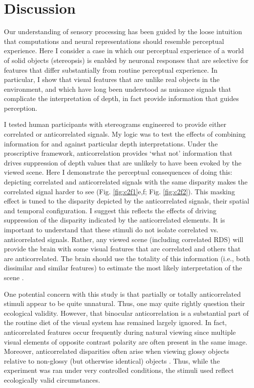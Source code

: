 \section{Discussion}
Our understanding of sensory processing has been guided by the loose intuition that computations and neural representations should resemble perceptual experience. Here I consider a case in which our perceptual experience of a world of solid objects (stereopsis) is enabled by neuronal responses that are selective for features that differ substantially from routine perceptual experience. In particular, I show that visual features that are unlike real objects in the environment, and which have long been understood as nuisance signals that complicate the interpretation of depth, in fact provide information that guides perception.

I tested human participants with stereograms engineered to provide either correlated or anticorrelated signals. My logic was to test the effects of combining information for and against particular depth interpretations. Under the proscriptive framework, anticorrelation provides `what not' information that drives suppression of depth values that are unlikely to have been evoked by the viewed scene. Here I demonstrate the perceptual consequences of doing this: depicting correlated and anticorrelated signals with the same disparity makes the correlated signal harder to see (Fig. \ref{fig:c2f1}e,f; Fig. \ref{fig:c2f2}). This masking effect is tuned to the disparity depicted by the anticorrelated signals, their spatial and temporal configuration. I suggest this reflects the effects of driving suppression of the disparity indicated by the anticorrelated elements. It is important to understand that these stimuli do not isolate correlated vs. anticorrelated signals. Rather, any viewed scene (including correlated RDS) will provide the brain with some visual features that are correlated and others that are anticorrelated. The brain should use the totality of this information (i.e., both dissimilar and similar features) to estimate the most likely interpretation of the scene \cite{Goncalves:2017aa}.

One potential concern with this study is that partially or totally anticorrelated stimuli appear to be quite unnatural. Thus, one may quite rightly question their ecological validity. However, that binocular anticorrelation is a substantial part of the routine diet of the visual system has remained largely ignored. In fact, anticorrelated features occur frequently during natural viewing since multiple visual elements of opposite contrast polarity are often present in the same image. Moreover, anticorrelated disparities often arise when viewing glossy objects relative to non-glossy (but otherwise identical) objects \cite{Muryy:2014hk,Muryy:2016km}. Thus, while the experiment was ran under very controlled conditions, the stimuli used reflect ecologically valid circumstances. 

